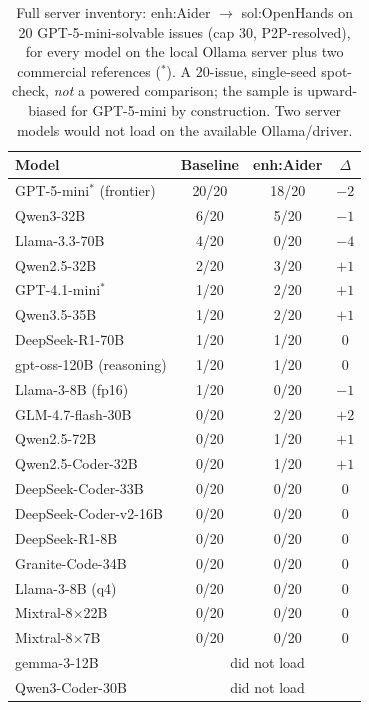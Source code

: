 \documentclass[journal]{IEEEtran}
\begin{document}
\begin{table}[t]
\centering
\caption{Full server inventory: enh:Aider $\rightarrow$ sol:OpenHands on 20 GPT-5-mini-solvable issues (cap 30, P2P-resolved), for every model on the local Ollama server plus two commercial references ($^{*}$). A 20-issue, single-seed spot-check, \emph{not} a powered comparison; the sample is upward-biased for GPT-5-mini by construction. Two server models would not load on the available Ollama/driver.}
\label{tab:spread}
\footnotesize
\setlength{\tabcolsep}{5pt}
\begin{tabular}{@{}lccc@{}}
\toprule
Model & Baseline & enh:Aider & $\Delta$ \\
\midrule
GPT-5-mini$^{*}$ (frontier)    & 20/20 & 18/20 & $-2$ \\
Qwen3-32B                      & 6/20  & 5/20  & $-1$ \\
Llama-3.3-70B                  & 4/20  & 0/20  & $-4$ \\
Qwen2.5-32B                    & 2/20  & 3/20  & $+1$ \\
GPT-4.1-mini$^{*}$             & 1/20  & 2/20  & $+1$ \\
Qwen3.5-35B                    & 1/20  & 2/20  & $+1$ \\
DeepSeek-R1-70B                & 1/20  & 1/20  & $0$  \\
gpt-oss-120B (reasoning)       & 1/20  & 1/20  & $0$  \\
Llama-3-8B (fp16)              & 1/20  & 0/20  & $-1$ \\
GLM-4.7-flash-30B              & 0/20  & 2/20  & $+2$ \\
Qwen2.5-72B                    & 0/20  & 1/20  & $+1$ \\
Qwen2.5-Coder-32B              & 0/20  & 1/20  & $+1$ \\
DeepSeek-Coder-33B             & 0/20  & 0/20  & $0$  \\
DeepSeek-Coder-v2-16B          & 0/20  & 0/20  & $0$  \\
DeepSeek-R1-8B                 & 0/20  & 0/20  & $0$  \\
Granite-Code-34B               & 0/20  & 0/20  & $0$  \\
Llama-3-8B (q4)                & 0/20  & 0/20  & $0$  \\
Mixtral-8$\times$22B           & 0/20  & 0/20  & $0$  \\
Mixtral-8$\times$7B            & 0/20  & 0/20  & $0$  \\
\midrule
gemma-3-12B                    & \multicolumn{3}{c}{did not load} \\
Qwen3-Coder-30B                & \multicolumn{3}{c}{did not load} \\
\bottomrule
\end{tabular}
\end{table}
\end{document}
